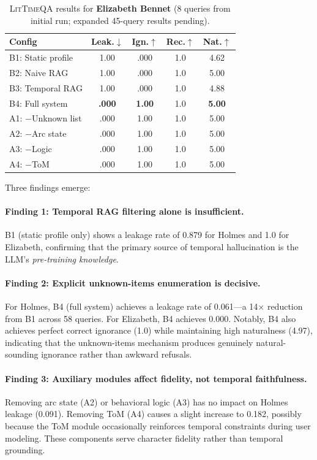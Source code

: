 \documentclass[11pt,a4paper]{article}
\begin{document}
\begin{table}[t]
\centering
\small
\begin{tabular}{@{}lcccc@{}}
\toprule
\textbf{Config} & \textbf{Leak.}$\downarrow$ & \textbf{Ign.}$\uparrow$ & \textbf{Rec.}$\uparrow$ & \textbf{Nat.}$\uparrow$ \\
\midrule
B1: Static profile & 1.00 & .000 & 1.0 & 4.62 \\
B2: Naive RAG & 1.00 & .000 & 1.0 & 5.00 \\
B3: Temporal RAG & 1.00 & .000 & 1.0 & 4.88 \\
B4: Full system & \textbf{.000} & \textbf{1.00} & 1.0 & \textbf{5.00} \\
\midrule
A1: $-$Unknown list & .000 & 1.00 & 1.0 & 5.00 \\
A2: $-$Arc state & .000 & 1.00 & 1.0 & 5.00 \\
A3: $-$Logic & .000 & 1.00 & 1.0 & 5.00 \\
A4: $-$ToM & .000 & 1.00 & 1.0 & 5.00 \\
\bottomrule
\end{tabular}
\caption{\textsc{LitTimeQA} results for \textbf{Elizabeth Bennet} (8 queries from initial run; expanded 45-query results pending).}
\label{tab:results-elizabeth}
\end{table}

Three findings emerge:

\paragraph{Finding 1: Temporal RAG filtering alone is insufficient.}
B1 (static profile only) shows a leakage rate of 0.879 for Holmes and 1.0 for Elizabeth, confirming that the primary source of temporal hallucination is the LLM's \textit{pre-training knowledge}.

\paragraph{Finding 2: Explicit unknown-items enumeration is decisive.}
For Holmes, B4 (full system) achieves a leakage rate of 0.061---a 14$\times$ reduction from B1 across 58 queries.
For Elizabeth, B4 achieves 0.000.
Notably, B4 also achieves perfect correct ignorance (1.0) while maintaining high naturalness (4.97), indicating that the unknown-items mechanism produces genuinely natural-sounding ignorance rather than awkward refusals.

\paragraph{Finding 3: Auxiliary modules affect fidelity, not temporal faithfulness.}
Removing arc state (A2) or behavioral logic (A3) has no impact on Holmes leakage (0.091).
Removing ToM (A4) causes a slight increase to 0.182, possibly because the ToM module occasionally reinforces temporal constraints during user modeling.
These components serve character fidelity rather than temporal grounding.
\end{document}
